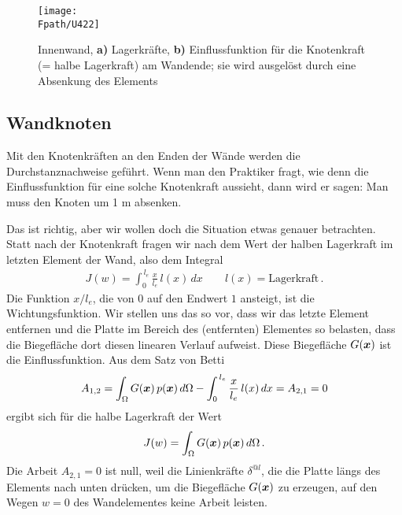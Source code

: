 {{{%
\begin{figure}[tbp]
\centering
\texttt{[image: \\Fpath/U422]}
\caption{Innenwand, \textbf{ a)} Lagerkr\"{a}fte, \textbf{ b)} Einflussfunktion f\"{u}r die Knotenkraft (= \glq halbe Lagerkraft\grq{}) am Wandende; sie wird ausgel\"{o}st durch eine Absenkung des Elements} \label{U422}
\end{figure}%

{\textcolor{sectionTitleBlue}{\section{Wandknoten}}\label{Korrektur31}
Mit den Knotenkr\"{a}ften an den Enden der W\"{a}nde werden die Durchstanznachweise gef\"{u}hrt. Wenn man den Praktiker fragt, wie denn die Einflussfunktion f\"{u}r eine solche Knotenkraft aussieht, dann wird er sagen: \glq Man muss den Knoten um 1 m absenken\grq{}.

Das ist richtig, aber wir wollen doch die Situation etwas genauer betrachten. Statt nach der Knotenkraft fragen wir nach dem Wert der \glq halben\grq{} Lagerkraft im letzten Element der Wand, also dem Integral
\begin{align}
J(w)= \int_0^{\,l_e} \frac{x}{l_e}\,l(x)\,dx  \qquad l(x) = \text{Lagerkraft}\,.
\end{align}
Die Funktion $x/l_e$, die von $0$ auf den Endwert $1$ ansteigt, ist die Wichtungsfunktion. Wir stellen uns das so vor, dass wir das letzte Element entfernen und die Platte im Bereich des (entfernten) Elementes so belasten, dass die Biegefl\"{a}che dort diesen linearen Verlauf aufweist. Diese Biegefl\"{a}che $G(\mbox{\boldmath $x$})$ ist die Einflussfunktion.  Aus dem Satz von Betti
\begin{align}
A_{1,2} = \int_{\Omega} G(\mbox{\boldmath $x$})\,p(\mbox{\boldmath $x$})\,d\Omega - \int_0^{\,l_e} \frac{x}{l_e}\,l(x)\,dx = A_{2,1} = 0
\end{align}
ergibt sich f\"{u}r die \glq halbe\grq{} Lagerkraft der Wert
\begin{align}
J(w) = \int_{\Omega} G(\mbox{\boldmath $x$})\,p(\mbox{\boldmath $x$})\,d\Omega\,.
\end{align}
Die Arbeit $A_{2,1} = 0 $ ist null, weil die Linienkr\"{a}fte $\delta^{@l}$, die die Platte l\"{a}ngs des Elements nach unten dr\"{u}cken, um die Biegefl\"{a}che $G(\mbox{\boldmath $x$})$ zu erzeugen, auf den Wegen $w = 0$ des Wandelementes keine Arbeit leisten.

}}}}
